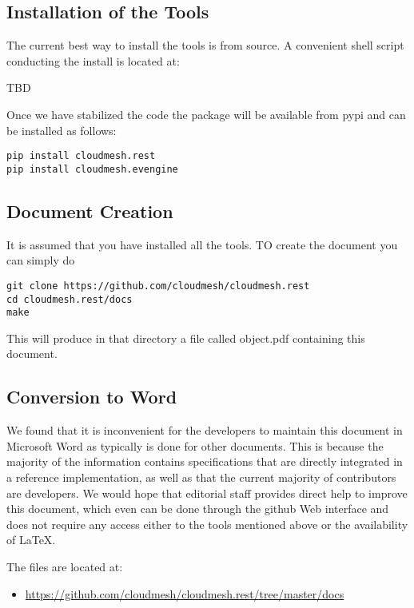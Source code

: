 \documentclass[9pt,twocolumn]{styles/osajnl}
\begin{document}
\subsection{Installation of the Tools}

The current best way to install the tools is from source. A convenient
shell script conducting the install is located at:

TBD

Once we have stabilized the code the package will be available from
pypi and can be installed as follows:

\begin{Verbatim}
pip install cloudmesh.rest
pip install cloudmesh.evengine
\end{Verbatim} 

\subsection{Document Creation}

It is assumed that you have installed all the tools. TO create the
document you can simply do

\begin{Verbatim}
git clone https://github.com/cloudmesh/cloudmesh.rest
cd cloudmesh.rest/docs
make
\end{Verbatim}

This will produce in that directory a file called object.pdf
containing this document.

\subsection{Conversion to Word}

We found that it is inconvenient for the developers to maintain this
document in Microsoft Word as typically is done for other
documents. This is because the majority of the information contains
specifications that are directly integrated in a reference
implementation, as well as that the current majority of contributors
are developers. We would hope that editorial staff provides direct
help to improve this document, which even can be done through the
github Web interface and does not require any access either to the
tools mentioned above or the availability of \LaTeX.

The files are located at:

\begin{itemize}
\item \url{https://github.com/cloudmesh/cloudmesh.rest/tree/master/docs}
\end{itemize}
\end{document}
